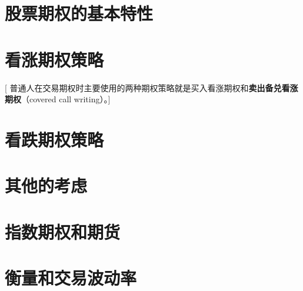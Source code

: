 \documentclass{book}
\begin{document}
\frontmatter
\tableofcontents
\mainmatter
\part{股票期权的基本特性}

\part{看涨期权策略}[
    普通人在交易期权时主要使用的两种期权策略就是买入看涨期权和\textbf{卖出备兑看涨期权}（covered call writing）。]

\part{看跌期权策略}
\part{其他的考虑}
\part{指数期权和期货}
\part{衡量和交易波动率}
\end{document}

